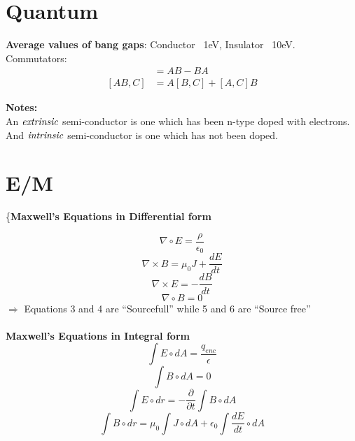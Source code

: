 \documentclass{article}
\begin{document}
{\section{Quantum}
{\bf{Average values of bang gaps}}: Conductor ~1eV, Insulator ~10eV.\\
Commutators:
\begin{align}
  [A,B] &= AB - BA\\
  [AB,C] &= A[B,C] + [A,C]B
\end{align}






{\bf{Notes:}}\\
\hspace*{.5in}An $\emph{extrinsic}$ semi-conductor is one which has been n-type doped with electrons.\\
\hspace*{.5in}And $\emph{intrinsic}$ semi-conductor is one which has not been doped.




\section{E/M}
\{\bf{Maxwell's Equations in Differential form}} 


\begin{equation}\nabla \circ E=\frac{\rho}{\epsilon_0}\end{equation}
\begin{equation}\nabla \times B=\mu_0 J + \frac{dE}{dt}\end{equation}
\begin{equation}\nabla \times E=-\frac{dB}{dt}\end{equation}
\begin{equation}\nabla \circ B=0\end{equation}
$\Rightarrow$ Equations 3 and 4 are ``Sourcefull'' while 5 and 6 are ``Source free''\\
\\
{\bf{Maxwell's Equations in Integral form}}
\begin{equation}\int E \circ dA=\frac{q_{enc}}{\epsilon}\end{equation}
\begin{equation}\int B \circ dA=0\end{equation}
\begin{equation}\int E \circ dr=-\frac{\partial}{\partial t}\int B \circ dA \end{equation}
\begin{equation}\int B \circ dr=\mu_0 \int J \circ dA + \epsilon_0 \int \frac{dE}{dt}\circ dA\end{equation}
\end{document}
